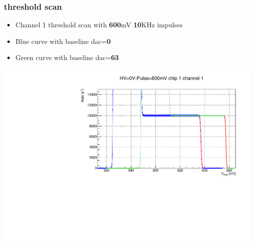\documentclass[aspectratio=169]{beamer}
\begin{document}
	\begin{frame}
	\frametitle{threshold scan}
		\begin{itemize}
			\item Channel 1 threshold scan with \textbf{600}mV \textbf{10}KHz impulses
			\item {\color{blue}Blue} curve with baseline dac=\textbf{0}
			\item {\color{green}Green} curve with baseline dac=\textbf{63}  
		\end{itemize}	
		\begin{center}
			\includegraphics[width=0.65 \textwidth]{IMG/ThScan_ch0.pdf}
		\end{center}
		
	\end{frame}

\end{document}
